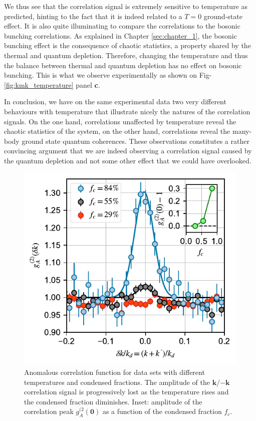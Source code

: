 We thus see that the \kmk correlation signal is extremely sensitive to temperature as predicted, hinting to the fact that it is indeed related to a $T=0$ ground-state effect. It is also quite illuminating to compare the \kmk correlations to the bosonic bunching \kk correlations. As explained in Chapter \ref{sec:chapter_1}, the bosonic bunching effect is the consequence of chaotic statistics, a property shared by the thermal and quantum depletion. Therefore, changing the temperature and thus the balance between thermal and quantum depletion has no effect on bosonic bunching. This is what we observe experimentally as shown on Fig-\ref{fig:kmk_temperature} panel \textbf{c}.

In conclusion, we have on the same experimental data two very different behaviours with temperature that illustrate nicely the natures of the correlation signals. On the one hand, \kk correlations unaffected by temperature reveal the chaotic statistics of the system, on the other hand, \kmk correlations reveal the many-body ground state quantum coherences. These observations constitutes a rather convincing argument that we are indeed observing a \kmk correlation signal caused by the quantum depletion and not some other effect that we could have overlooked.

\begin{figure}
    \centering
    \includegraphics{Fig/Chapter4/kmk_3_temp_errorbars.pdf}
    \caption{Anomalous correlation function for data sets with different temperatures and condensed fractions. The amplitude of the $\bm{k}$/$-\bm{k}$ correlation signal is progressively lost as the temperature rises and the condensed fraction diminishes. Inset: amplitude of the correlation peak $g^{(2}_{A}({\bm 0})$ as a function of the condensed fraction $f_c$.}
    \label{fig:kmk_3_temp}
\end{figure}

